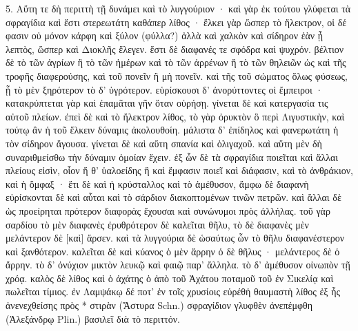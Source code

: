 \documentclass[a4paper, 11pt, oneside, polutonikogreek, german]{article}
\begin{document}
5. Αὕτη τε δὴ περιττὴ τῇ δυνάμει καὶ τὸ λυγγούριον · καὶ γὰρ ἐκ τούτου γλύφεται τὰ σφραγίδια καὶ ἔστι στερεωτάτη καθάπερ λίθος · ἕλκει γὰρ ὥσπερ τὸ ἤλεκτρον, οἱ δέ φασιν οὐ μόνον κάρφη καὶ ξύλον (φύλλα?) ἀλλὰ καὶ χαλκὸν καὶ σίδηρον ἐὰν ᾖ λεπτὸς, ὥσπερ καὶ Διοκλῆς ἔλεγεν. ἔστι δὲ διαφανές τε σφόδρα καὶ ψυχρόν. βέλτιον δὲ τὸ τῶν ἀγρίων ἢ τὸ τῶν ἡμέρων καὶ τὸ τῶν ἀρρένων ἢ τὸ τῶν θηλειῶν ὡς καὶ τῆς τροφῆς διαφερούσης, καὶ τοῦ πονεῖν ἢ μὴ πονεῖν. καὶ τῆς τοῦ σώματος ὅλως φύσεως, ᾗ τὸ μὲν ξηρότερον τὸ δ' ὑγρότερον. εὑρίσκουσι δ' ἀνορύττοντες οἱ ἔμπειροι · κατακρύπτεται γὰρ καὶ ἐπαμᾶται γῆν ὅταν οὐρήσῃ. γίνεται δὲ καὶ κατεργασία τις αὐτοῦ πλείων. ἐπεὶ δὲ καὶ τὸ ἤλεκτρον λίθος, τὸ γὰρ ὀρυκτὸν ὃ περὶ Λιγυστικὴν, καὶ τούτῳ ἂν ἡ τοῦ ἕλκειν δύναμις ἀκολουθοίη. μάλιστα δ' ἐπίδηλος καὶ φανερωτάτη ἡ τὸν σίδηρον ἄγουσα. γίνεται δὲ καὶ αὕτη σπανία καὶ ὀλιγαχοῦ. καὶ αὕτη μὲν δὴ συναριθμείσθω τὴν δύναμιν ὁμοίαν ἔχειν. ἐξ ὧν δὲ τὰ σφραγίδια ποιεῖται καὶ ἄλλαι πλείους εἰσὶν, οἷον ἥ θ' ὑαλοείδης ἣ καὶ ἔμφασιν ποιεῖ καὶ διάφασιν, καὶ τὸ ἀνθράκιον, καὶ ἡ ὄμφαξ · ἔτι δὲ καὶ ἡ κρύσταλλος καὶ τὸ ἀμέθυσον, ἄμφω δὲ διαφανὴ εὑρίσκονται δὲ καὶ αὗται καὶ τὸ σάρδιον διακοπτομένων τινῶν πετρῶν. καὶ ἄλλαι δὲ ὡς προείρηται πρότερον διαφορὰς ἔχουσαι καὶ συνώνυμοι πρὸς ἀλλήλας. τοῦ γὰρ σαρδίου τὸ μὲν διαφανὲς ἐρυθρότερον δὲ καλεῖται θῆλυ, τὸ δὲ διαφανὲς μὲν μελάντερον δὲ [καὶ] ἄρσεν. καὶ τὰ λυγγούρια δὲ ὡσαύτως ὧν τὸ θῆλυ διαφανέστερον καὶ ξανθότερον. καλεῖται δὲ καὶ κύανος ὁ μὲν ἄρρην ὁ δὲ θῆλυς · μελάντερος δὲ ὁ ἄρρην. τὸ δ' ὀνύχιον μικτὸν λευκῷ καὶ φαιῷ παρ' ἄλληλα. τὸ δ' ἀμέθυσον οἰνωπὸν τῇ χρόᾳ. καλὸς δὲ λίθος καὶ ὁ ἀχάτης ὁ ἀπὸ τοῦ Ἀχάτου ποταμοῦ τοῦ ἐν Σικελίᾳ καὶ πωλεῖται τίμιος. ἐν Λαμψάκῳ δέ ποτ' ἐν τοῖς χρυσίοις εὑρέθἡ θαυμαστὴ λίθος ἐξ ἧς ἀνενεχθείσης πρὸς * στιρὰν (Ἄστυρα Schn.) σφραγίδιον γλυφθὲν ἀνεπέμφθη (Ἀλεξάνδρῳ Plin.) βασιλεῖ διὰ τὸ περιττόν.
\end{document}
